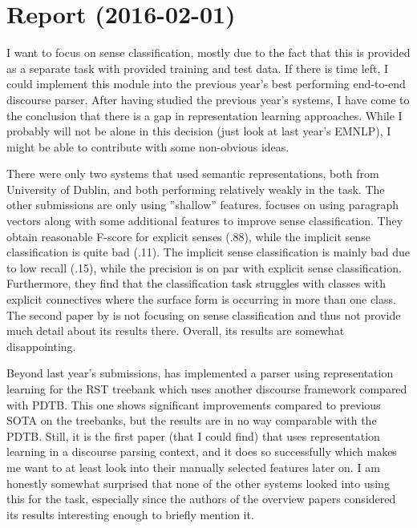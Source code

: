 
\section{Report (2016-02-01)}

I want to focus on sense classification, mostly due to the fact that this is provided as a separate task with provided training and test data. If there is time left, I could implement this module into the previous year's best performing end-to-end discourse parser. After having studied the previous year's systems, I have come to the conclusion that there is a gap in representation learning approaches. While I probably will not be alone in this decision (just look at last year's EMNLP), I might be able to contribute with some non-obvious ideas.

There were only two systems that used semantic representations, both from University of Dublin, and both performing relatively weakly in the task. The other submissions are only using ''shallow'' features. \cite{okita_dcu_2015} focuses on using paragraph vectors along with some additional features to improve sense classification. They obtain reasonable F-score for explicit senses (.88), while the implicit sense classification is quite bad (.11). The implicit sense classification is mainly bad due to low recall (.15), while the precision is on par with explicit sense classification. Furthermore, they find that the classification task struggles with classes with explicit connectives where the surface form is occurring in more than one class. The second paper by \cite{wang_dcu_2015} is not focusing on sense classification and thus not provide much detail about its results there. Overall, its results are somewhat disappointing.

Beyond last year's submissions, \cite{ji_representation_2014} has implemented a parser using representation learning for the RST treebank which uses another discourse framework compared with PDTB. This one shows significant improvements compared to previous SOTA on the treebanks, but the results are in no way comparable with the PDTB. Still, it is the first paper (that I could find) that uses representation learning in a discourse parsing context, and it does so successfully which makes me want to at least look into their manually selected features later on. I am honestly somewhat surprised that none of the other systems looked into using this for the task, especially since the authors of the overview papers considered its results interesting enough to briefly mention it.

